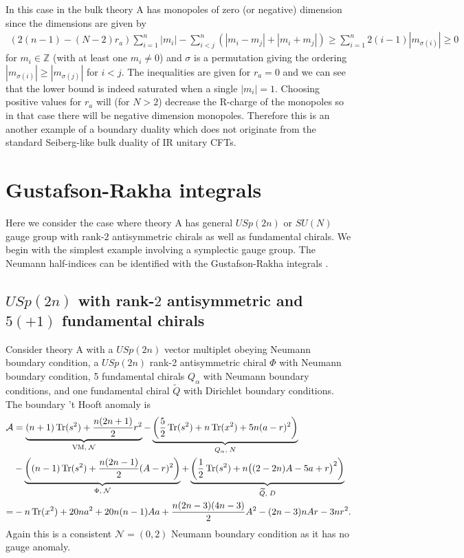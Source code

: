 \documentclass[12pt]{article}
\newcommand{\Zb}{\mathbb{Z}}
\newcommand{\Acal}{\mathcal{A}}
\newcommand{\Ncal}{\mathcal{N}}
\DeclareMathOperator*{\Tr}{{\rm Tr}}
\numberwithin{equation}{section}
\begin{document}
In this case in the bulk theory A has monopoles of zero (or negative) dimension since the dimensions are given by
\begin{align}
\label{Mono_Ch_soN_Nm2}
    (2(n-1) - (N-2)r_a) \sum_{i = 1}^n |m_i| - \sum_{i < j}^n \left( |m_i - m_j| + |m_i + m_j| \right)
    \ge \sum_{i=1}^n 2(i-1)|m_{\sigma(i)}| \ge 0
\end{align}
for $m_i \in \Zb$ (with at least one $m_i \ne 0$) and $\sigma$ is a permutation giving the ordering $|m_{\sigma(i)}| \ge |m_{\sigma(j)}|$ for $i < j$. The inequalities are given for $r_a = 0$ and we can see that the lower bound is indeed saturated when a single $|m_i| = 1$. Choosing positive values for $r_a$ will (for $N > 2$) decrease the R-charge of the monopoles so in that case there will be negative dimension monopoles.
Therefore this is an another example of a boundary duality which does not originate from the standard Seiberg-like bulk duality of IR unitary CFTs.

\section{Gustafson-Rakha integrals}
\label{sec_GR_integral}
Here we consider the case where theory A has general $USp(2n)$ or $SU(N)$ gauge group with rank-$2$ antisymmetric chirals as well as fundamental chirals. We begin with the simplest example involving a symplectic gauge group. The Neumann half-indices can be identified with the Gustafson-Rakha integrals \cite{MR1266569}.

\subsection{$USp(2n)$ with rank-$2$ antisymmetric and $5(+1)$ fundamental chirals}
\label{sec_GNR_USp_AS_integrals}
Consider theory A with a $USp(2n)$ vector multiplet obeying Neumann boundary condition, 
a $USp(2n)$ rank-2 antisymmetric chiral $\Phi$ with Neumann boundary condition, 
5 fundamental chirals $Q_{\alpha}$ with Neumann boundary conditions, 
and one fundamental chiral $\widetilde{Q}$ with Dirichlet boundary conditions. 
The boundary 't Hooft anomaly is 
\begin{align}
\label{bdy_USp2n_AS_6_anomA}
\Acal & = \underbrace{(n+1)\Tr(s^2) + \frac{n(2n+1)}{2}r^2}_{\textrm{VM}, \; \Ncal}
 - \underbrace{\left( \frac{5}{2}\Tr(s^2) + n\Tr(x^2) + 5n(a-r)^2 \right)}_{Q_{\alpha}, \; N}
  \nonumber \\
 & - \underbrace{\left( (n-1)\Tr(s^2) + \frac{n(2n-1)}{2}(A - r)^2 \right)}_{\Phi, \; \Ncal}
  + \underbrace{\left( \frac{1}{2}\Tr(s^2) + n\big( (2 - 2n)A - 5a + r \big)^2 \right)}_{\widetilde{Q}, \; D}
  \nonumber\\
  = & - n \Tr(x^2) + 20n a^2 + 20n(n-1)Aa + \frac{n(2n-3)(4n-3)}{2}A^2 -(2n-3)n Ar - 3n r^2. 
\end{align}
Again this is a consistent $\mathcal{N}=(0,2)$ Neumann boundary condition as it has no gauge anomaly. 
\end{document}
